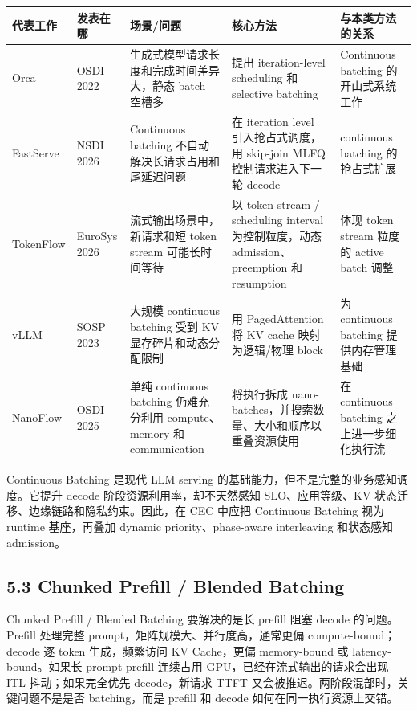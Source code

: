 \documentclass[a4paper,10pt]{ctexart}
\begin{document}
\begin{table}[H]
\centering
\scriptsize
\setlength{\tabcolsep}{3pt}
\renewcommand{\arraystretch}{1.15}
\begin{tabularx}{\textwidth}{|X|X|X|X|X|}
\hline
\textbf{代表工作} & \textbf{发表在哪} & \textbf{场景/问题} & \textbf{核心方法} & \textbf{与本类方法的关系} \\ \hline
Orca & OSDI 2022 & 生成式模型请求长度和完成时间差异大，静态 batch 空槽多 & 提出 iteration-level scheduling 和 selective batching & Continuous batching 的开山式系统工作 \\ \hline
FastServe & NSDI 2026 & Continuous batching 不自动解决长请求占用和尾延迟问题 & 在 iteration level 引入抢占式调度，用 skip-join MLFQ 控制请求进入下一轮 decode & continuous batching 的抢占式扩展 \\ \hline
TokenFlow & EuroSys 2026 & 流式输出场景中，新请求和短 token stream 可能长时间等待 & 以 token stream / scheduling interval 为控制粒度，动态 admission、preemption 和 resumption & 体现 token stream 粒度的 active batch 调整 \\ \hline
vLLM & SOSP 2023 & 大规模 continuous batching 受到 KV 显存碎片和动态分配限制 & 用 PagedAttention 将 KV cache 映射为逻辑/物理 block & 为 continuous batching 提供内存管理基础 \\ \hline
NanoFlow & OSDI 2025 & 单纯 continuous batching 仍难充分利用 compute、memory 和 communication & 将执行拆成 nano-batches，并搜索数量、大小和顺序以重叠资源使用 & 在 continuous batching 之上进一步细化执行流 \\ \hline
\end{tabularx}
\end{table}




Continuous Batching 是现代 LLM serving 的基础能力，但不是完整的业务感知调度。它提升 decode 阶段资源利用率，却不天然感知 SLO、应用等级、KV 状态迁移、边缘链路和隐私约束。因此，在 CEC 中应把 Continuous Batching 视为 runtime 基座，再叠加 dynamic priority、phase-aware interleaving 和状态感知 admission。


\subsection*{5.3 Chunked Prefill / Blended Batching}

Chunked Prefill / Blended Batching 要解决的是长 prefill 阻塞 decode 的问题。Prefill 处理完整 prompt，矩阵规模大、并行度高，通常更偏 compute-bound；decode 逐 token 生成，频繁访问 KV Cache，更偏 memory-bound 或 latency-bound。如果长 prompt prefill 连续占用 GPU，已经在流式输出的请求会出现 ITL 抖动；如果完全优先 decode，新请求 TTFT 又会被推迟。两阶段混部时，关键问题不是是否 batching，而是 prefill 和 decode 如何在同一执行资源上交错。
\end{document}
